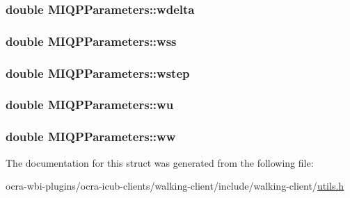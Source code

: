 \hypertarget{structMIQPParameters_ac13ff21321154d5cebba21855ac8357f}{
\subsubsection[{wdelta}]{\setlength{\rightskip}{0pt plus 5cm}double {\bf \-M\-I\-Q\-P\-Parameters\-::wdelta}}}\label{structMIQPParameters_ac13ff21321154d5cebba21855ac8357f}
\hypertarget{structMIQPParameters_a317395e51ff98506316b9a63cf03d48f}{
\subsubsection[{wss}]{\setlength{\rightskip}{0pt plus 5cm}double {\bf \-M\-I\-Q\-P\-Parameters\-::wss}}}\label{structMIQPParameters_a317395e51ff98506316b9a63cf03d48f}
\hypertarget{structMIQPParameters_a284df9b565513a826e92098f0a23f5cc}{
\subsubsection[{wstep}]{\setlength{\rightskip}{0pt plus 5cm}double {\bf \-M\-I\-Q\-P\-Parameters\-::wstep}}}\label{structMIQPParameters_a284df9b565513a826e92098f0a23f5cc}
\hypertarget{structMIQPParameters_aed141afdcc25904d53526a5f2c977427}{
\subsubsection[{wu}]{\setlength{\rightskip}{0pt plus 5cm}double {\bf \-M\-I\-Q\-P\-Parameters\-::wu}}}\label{structMIQPParameters_aed141afdcc25904d53526a5f2c977427}
\hypertarget{structMIQPParameters_a7223a1cda1e4565d18729f1e7bba87e0}{
\subsubsection[{ww}]{\setlength{\rightskip}{0pt plus 5cm}double {\bf \-M\-I\-Q\-P\-Parameters\-::ww}}}\label{structMIQPParameters_a7223a1cda1e4565d18729f1e7bba87e0}


\-The documentation for this struct was generated from the following file\-:\begin{DoxyCompactItemize}
\item 
ocra-\/wbi-\/plugins/ocra-\/icub-\/clients/walking-\/client/include/walking-\/client/\hyperlink{utils_8h}{utils.\-h}\end{DoxyCompactItemize}
